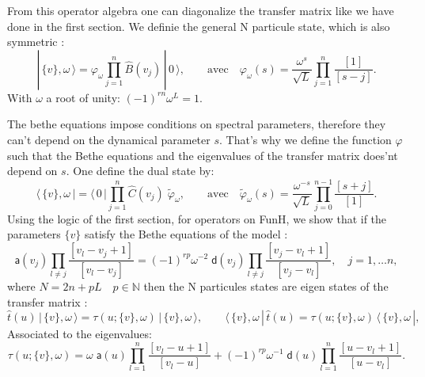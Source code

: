 \documentclass[12pt]{article}
\newcommand{\bra}[1]{\langle\,#1\,|}
\newcommand{\ket}[1]{|\,#1\,\rangle}
\begin{document}
From this operator algebra one can diagonalize the transfer matrix like we have done in the first section. We definie the general N particule state, which is also symmetric : 
\begin{equation}\label{state}
  \ket{ \{v\}, \omega }
 = \varphi_\omega \prod_{j=1}^n\widehat{B}(v_j) \, \ket{0},
 \qquad
 \text{avec}\quad
 \varphi_\omega(s)=\frac{\omega^s}{\sqrt{L}}\prod_{j=1}^n\frac{[1]}{[s-j]}.
\end{equation}
With $\omega$  a root of unity: $(-1)^{rn}\omega^L=1$. 

The bethe equations impose conditions on spectral parameters, therefore they can't depend on the dynamical parameter $s$. That's why we define the function $\varphi$ such that the Bethe equations and the eigenvalues of the transfer matrix does'nt depend on $s$. One define the dual state by: 
\begin{equation}\label{dual}
   \bra{\{ v\} ,\omega}= \bra{0}\prod_{j=1}^n \widehat{C}(v_j) \; \widetilde{\varphi}_\omega,
   \qquad \text{avec}\quad 
   \widetilde{\varphi}_\omega(s)=  \frac{{\omega}^{- s}}{\sqrt{L}}  \prod_{j=0}^{n-1} \frac{[s+j]}{[1]}.
\end{equation}
Using the logic of the first section, for operators on FunH, we show that if the parameters $\{v\}$ satisfy the Bethe equations of the model :
\begin{equation}\label{Bethe}
    \mathsf{a}(v_j)  \prod_{l\ne j} \frac{[v_l-v_j+1]}{[v_l-v_j]} 
    =  (-1)^{rp} \omega^{-2} \; \mathsf{d}(v_j)  \prod_{l\ne j} \frac{[v_j-v_l+1]}{[v_j-v_l]} ,
    \quad j=1,\ldots n,
\end{equation}
where $N=2n+pL \quad p \in \mathbb{N}$ 
then the N particules states are eigen states of the transfer matrix :
\begin{equation}\label{act-transfer}
   \widehat{t}(u)\, \ket{\{ v\},\omega }= \tau (u; \{ v\},\omega )\, \ket{\{ v\},\omega },
   \qquad
   \bra{ \{v\}, \omega }\,\widehat{t} (u) = \tau(u; \{v\},\omega )\,  \bra{ \{v\} ,\omega },
\end{equation}
Associated to the eigenvalues:
\begin{equation}
   \tau (u; \{v\},\omega)
    = \omega \; \mathsf{a}(u) \prod_{l=1}^n \frac{[v_l-u+1]}{[v_l-u]}
        +  (-1)^{rp}  \omega^{-1} \; \mathsf{d}(u) \prod_{l=1}^n \frac{[u-v_l+1]}{[u-v_l]}.
    \label{tau}
    \end{equation}
\end{document}
